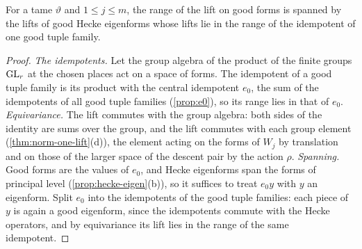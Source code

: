 \begin{proposition}\label{prop:range-good-lift}
For a tame $\vartheta$ and $1\le j\le m$, the range of the lift on good forms is spanned by the lifts of good Hecke eigenforms whose lifts lie in the range of the idempotent of one good tuple family.
\end{proposition}

\begin{proof}
\emph{The idempotents.} Let the group algebra of the product of the finite groups $\operatorname{GL}_r$ at the chosen places act on a space of forms. The idempotent of a good tuple family is its product with the central idempotent
$e_0$, the sum of the idempotents of all good tuple families (\cref{prop:e0}), so its range lies in that of $e_0$. \emph{Equivariance.} The lift commutes with the group algebra: both sides of the identity are sums
over the group, and the lift commutes with each group element (\cref{thm:norm-one-lift}(d)), the element acting on the forms of $W_j$ by translation and on those of the larger space of the descent pair by the
action $\rho$. \emph{Spanning.} Good forms are the values of $e_0$, and Hecke eigenforms span the forms of principal level (\cref{prop:hecke-eigen}(b)), so it suffices to treat $e_0y$ with $y$ an eigenform. Split $e_0$ into
the idempotents of the good tuple families: each piece of $y$ is again a good eigenform, since the idempotents commute with the Hecke operators, and by equivariance its lift lies in the range of the same
idempotent.
\end{proof}
